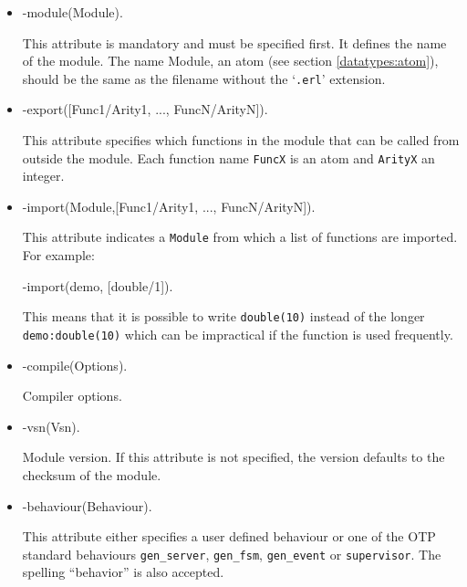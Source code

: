 \begin{itemize}

	\item \begin{erlangim}
	-module(Module).
	\end{erlangim}
	This attribute is mandatory and must be specified first. It
        defines the name of the module. The name Module, an atom (see section \ref{datatypes:atom}),
        should be the same as the filename without the `\texttt{.erl}' extension.

	\item \begin{erlangim}
	-export([Func1/Arity1, ..., FuncN/ArityN]).
	\end{erlangim}
	This attribute specifies which functions in the module that
        can be called from outside the module. Each function name
        \texttt{FuncX} is an atom and \texttt{ArityX} an integer.

	\item \begin{erlangim}
	-import(Module,[Func1/Arity1, ..., FuncN/ArityN]).
	\end{erlangim}
	This attribute indicates a \texttt{Module} from which a list of functions
        are imported.  For example:

	\begin{erlangim}
	-import(demo, [double/1]).
	\end{erlangim}
	This means that it is possible to write \texttt{double(10)} instead of
        the longer \texttt{demo:double(10)} which can be impractical if the
        function is used frequently.

	\item \begin{erlangim}
	-compile(Options).
	\end{erlangim}
	Compiler options.

	\item \begin{erlangim}
	-vsn(Vsn).
	\end{erlangim}
	Module version. If this attribute is not specified, the
        version defaults to the checksum of the module.

	\item \begin{erlangim}
	-behaviour(Behaviour).
	\end{erlangim}
	This attribute either specifies a user defined behaviour or
        one of the OTP standard behaviours \texttt{gen\_server},
        \texttt{gen\_fsm}, \texttt{gen\_event} or
        \texttt{supervisor}. The spelling ``behavior'' is also accepted.

\end{itemize}


